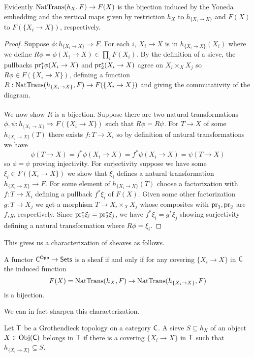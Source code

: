 Evidently $\mathrm{NatTrans}(h_{X},F)\to F(X)$ is the bijection induced by the Yoneda embedding and the vertical maps given by restriction $h_{X}$ to $h_{\{X_{i}\to X\}}$ and $F(X)$ to $F(\{X_{i}\to X\})$, respectively. 
\begin{proof}
    Suppose $\phi:h_{\{X_{i}\to X\}}\Rightarrow F$. For each $i$, $X_{i}\to X$ is in $h_{\{X_{i}\to X\}}(X_{i})$ where we define $R\phi = \phi(X_{i}\to X)\in\prod_{i} F(X_{i})$. By the definition of a sieve, the pullbacks $\mathrm{pr}_{1}^{*}\phi(X_{i}\to X)$ and $\mathrm{pr}_{2}^{*}(X_{i}\to X)$ agree on $X_{i}\times_{X}X_{j}$ so $R\phi\in F(\{X_{i}\to X\})$, defining a function $R:\mathrm{NatTrans}(h_{\{X_{i}\to X\}}, F)\to F(\{X_{i}\to X\})$ and giving the commutativity of the diagram. 
    \\\\
    We now show $R$ is a bijection. Suppose there are two natural transformations $\phi,\psi:h_{\{X_{i}\to X\}}\Rightarrow F(\{X_{i}\to X\})$ such that $R\phi = R\psi$. For $T\to X$ of some $h_{\{X_{i}\to X\}}(T)$ there exists $f:T\to X_{i}$ so by definition of natural transformations we have 
    $$\phi(T\to X)=f^{*}\phi(X_{i}\to X)=f^{*}\psi(X_{i}\to X)=\psi(T\to X)$$
    so $\phi=\psi$ proving injectivity. For surjectivity suppose we have some $\xi_{i}\in F(\{X_{i}\to X\})$ we show that $\xi_{i}$ defines a natural transformation $h_{\{X_{i}\to X\}}\to F$. For some element of $h_{\{X_{i}\to X\}}(T)$ choose a factorization with $f:T\to X_{i}$ defining a pullback $f^{*}\xi_{i}$ of $F(X)$. Given some other factorization $g:T\to X_{j}$ we get a morphism $T\to X_{i}\times_{X}X_{j}$ whose composites with $\mathrm{pr}_{1},\mathrm{pr}_{2}$ are $f,g$, respectively. Since $\mathrm{pr}_{1}^{*}\xi_{i}=\mathrm{pr}_{2}^{*}\xi_{j}$, we have $f^{*}\xi_{i}=g^{*}\xi_{j}$ showing surjectivity defining a natural transformation where $R\phi=\xi_{i}$. 
\end{proof}
This gives us a characterization of sheaves as follows. 
\begin{corollary}\label{corr: sheaf and covering condition}
    A functor $\mathsf{C}^{\mathsf{Opp}}\to\mathsf{Sets}$ is a sheaf if and only if for any covering $\{X_{i}\to X\}$ in $\mathsf{C}$ the induced function 
    $$F(X)=\mathrm{NatTrans}(h_{X},F)\to\mathrm{NatTrans}(h_{\{X_{i}\to X\}},F)$$
    is a bijection.
\end{corollary}
We can in fact sharpen this characterization. 
\begin{definition}[Belong To]\label{def: belong to}
    Let $\mathsf{T}$ be a Grothendieck topology on a category $\mathsf{C}$. A sieve $S\subseteq h_{X}$ of an object $X\in\mathrm{Obj}(\mathsf{C})$ belongs in $\mathsf{T}$ if there is a covering $\{X_{i}\to X\}$ in $\mathsf{T}$ such that $h_{\{X_{i}\to X\}}\subseteq S$. 
\end{definition}
